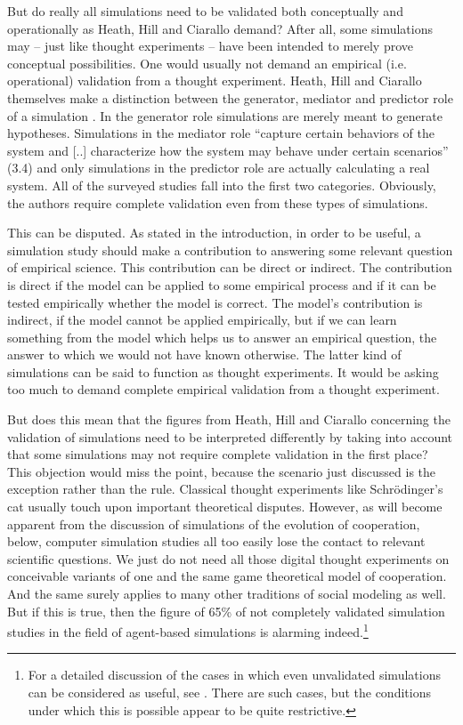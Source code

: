 \documentclass[12pt, english, a4paper]{article}
\begin{document}
But do really all simulations need to be validated both conceptually
and operationally as Heath, Hill and Ciarallo demand? After all, some
simulations may – just like thought experiments – have been intended
to merely prove conceptual possibilities.  One would usually not
demand an empirical (i.e. operational) validation from a thought
experiment. Heath, Hill and Ciarallo themselves make a distinction
between the generator, mediator and predictor role of a simulation
\citep[2.16]{heath-et-al:2009}. In the generator role simulations are
merely meant to generate hypotheses. Simulations in the mediator role
“capture certain behaviors of the system and [..] characterize how the
system may behave under certain scenarios” (3.4) and only simulations
in the predictor role are actually calculating a real system. All of
the surveyed studies fall into the first two categories. Obviously,
the authors require complete validation even from these types of
simulations.

This can be disputed. As stated in the introduction, in order to be
useful, a simulation study should make a contribution to answering
some relevant question of empirical science. This contribution can be
direct or indirect. The contribution is direct if the model can be
applied to some empirical process and if it can be tested empirically
whether the model is correct. The model’s contribution is indirect, if
the model cannot be applied empirically, but if we can learn something
from the model which helps us to answer an empirical question, the
answer to which we would not have known otherwise. The latter kind of
simulations can be said to function as thought experiments. It would
be asking too much to demand complete empirical validation from a
thought experiment.

But does this mean that the figures from Heath, Hill and Ciarallo
concerning the validation of simulations need to be interpreted
differently by taking into account that some simulations may not
require complete validation in the first place? This objection would
miss the point, because the scenario just discussed is the exception
rather than the rule. Classical thought experiments like Schrödinger’s
cat usually touch upon important theoretical disputes. However, as
will become apparent from the discussion of simulations of the
evolution of cooperation, below, computer simulation studies all too
easily lose the contact to relevant scientific questions. We just do
not need all those digital thought experiments on conceivable variants
of one and the same game theoretical model of cooperation. And the
same surely applies to many other traditions of social modeling as
well. But if this is true, then the figure of 65\% of not completely
validated simulation studies in the field of agent-based simulations
is alarming indeed.\footnote{For a detailed discussion of the cases in
  which even unvalidated simulations can be considered as useful, see
  \citet{arnold:2013}. There are such cases, but the conditions under
  which this is possible appear to be quite restrictive.}
\end{document}

